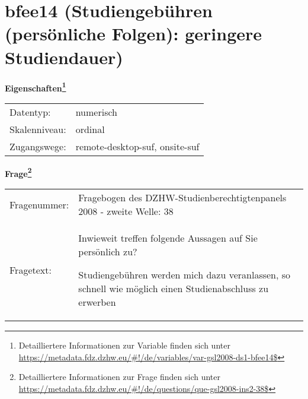 
    \setcounter{footnote}{0}

    \vspace*{-1.8cm}
	\section{bfee14 (Studiengebühren (persönliche Folgen): geringere Studiendauer)}
	\label{section:bfee14}



    \vspace*{0.5cm}
    \noindent\textbf{Eigenschaften\footnote{Detailliertere Informationen zur Variable finden sich unter
		\url{https://metadata.fdz.dzhw.eu/\#!/de/variables/var-gsl2008-ds1-bfee14$}}}\\
	\begin{tabularx}{\hsize}{@{}lX}
	Datentyp: & numerisch \\
	Skalenniveau: & ordinal \\
	Zugangswege: &
	  remote-desktop-suf, 
	  onsite-suf
 \\
    \end{tabularx}



				\vspace*{0.5cm}
                \noindent\textbf{Frage\footnote{Detailliertere Informationen zur Frage finden sich unter
		              \url{https://metadata.fdz.dzhw.eu/\#!/de/questions/que-gsl2008-ins2-38$}}}\\
				\begin{tabularx}{\hsize}{@{}lX}
					Fragenummer: &
					  Fragebogen des DZHW-Studienberechtigtenpanels 2008 - zweite Welle:
					  38
 \\
					Fragetext: & Inwieweit treffen folgende Aussagen auf Sie persönlich zu?\par  Studiengebühren werden mich dazu veranlassen, so schnell wie möglich einen Studienabschluss zu erwerben \\
				\end{tabularx}





